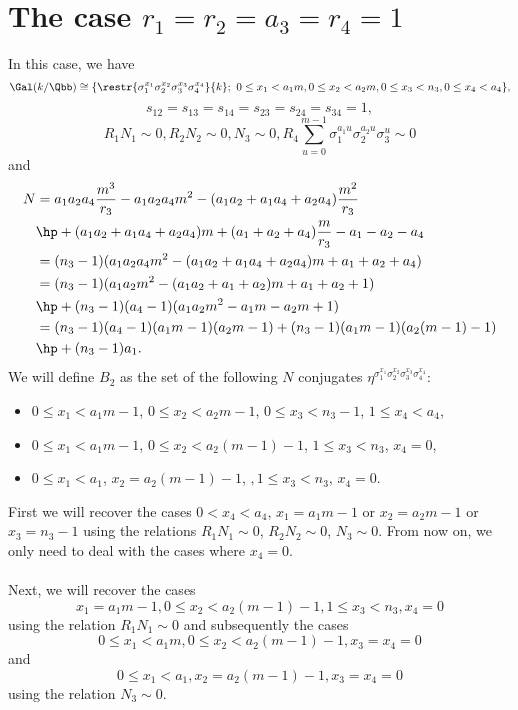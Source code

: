 \section{The case $r_1=r_2=a_3=r_4=1$}
In this case, we have
$$\Gal(k/\Qbb)\cong
 \{\restr{\sigma_1^{x_1}\sigma_2^{x_2}\sigma_3^{x_3}\sigma_4^{x_4}}{k};~  0\leq x_1<a_1m, 0\leq x_2<a_2m, 0\leq x_3<n_3,0\leq x_4<a_4\},$$
  $$s_{12}=s_{13}=s_{14}=s_{23}=s_{24}=s_{34}=1,$$
$$R_1N_1\sim 0, R_2N_2\sim 0, N_3 \sim 0, R_4 \sum_{u=0}^{m-1}\sigma_1^{a_1u}\sigma_2^{a_2u}\sigma_3^{u} \sim 0$$
and
\begin{align*}
N&=a_1a_2a_4\frac{m^3}{r_3}-a_1a_2a_4m^2-(a_1a_2+a_1a_4+a_2a_4)\frac{m^2}{r_3}\\
&\hp+(a_1a_2+a_1a_4+a_2a_4)m+(a_1+a_2+a_4)\frac{m}{r_3}-a_1-a_2-a_4\\
&=(n_3-1)(a_1a_2a_4m^2-(a_1a_2+a_1a_4+a_2a_4)m+a_1+a_2+a_4)\\
&=(n_3-1)(a_1a_2m^2-(a_1a_2+a_1+a_2)m+a_1+a_2+1)\\
&\hp+(n_3-1)(a_4-1)(a_1a_2m^2-a_1m-a_2m+1)\\
&=(n_3-1)(a_4-1)(a_1m-1)(a_2m-1)+(n_3-1)(a_1m-1)(a_2(m-1)-1)\\
&\hp+(n_3-1)a_1.
\end{align*}
We will define $B_2$ as the set of the following $N$ conjugates $\eta^{\sigma_1^{x_1}\sigma_2^{x_2}\sigma_3^{x_3}\sigma_4^{x_4}}$:
\begin{itemize}
\item $0\le x_1 <a_1m-1$, $ 0\le x_2 < a_2m-1$, $ 0 \le x_3<n_3-1$, $ 1\le x_4<a_4$,
\item $0\le x_1 < a_1m-1$, $ 0\le x_2 < a_2(m-1)-1$, $ 1\leq x_3 < n_3$, $ x_4=0$,
\item $0\le x_1 < a_1$, $ x_2=a_2(m-1)-1$, $, 1\leq x_3 < n_3$, $ x_4=0$.
\end{itemize}

First we will recover the cases $0<x_4<a_4$, $x_1=a_1m-1$ or $x_2=a_2m-1$ or $x_3=n_3-1$ using the relations $R_1N_1\sim 0$, $ R_2N_2\sim 0$, $ N_3\sim 0$. From now on, we only need to deal with the cases where $x_4=0$.
\paragraph*{}
Next, we will recover the cases $$x_1=a_1m-1, 0\le x_2 < a_2(m-1)-1, 1\leq x_3 <n_3, x_4=0$$ using the relation $R_1N_1\sim 0$ and subsequently the cases $$0\leq x_1 < a_1m,  0\le x_2 < a_2(m-1)-1, x_3 = x_4=0$$ and $$0\le x_1 < a_1, x_2 = a_2(m-1)-1, x_3 = x_4=0$$ using the relation $N_3\sim 0$.

